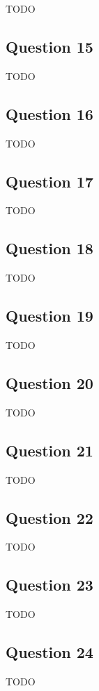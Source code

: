 \documentclass[12pt, letterpaper, oneside]{book}
\begin{document}
TODO

\subsection{Question 15}

TODO

\subsection{Question 16}

TODO

\subsection{Question 17}

TODO

\subsection{Question 18}

TODO

\subsection{Question 19}

TODO

\subsection{Question 20}

TODO

\subsection{Question 21}

TODO

\subsection{Question 22}

TODO

\subsection{Question 23}

TODO

\subsection{Question 24}

TODO
\end{document}
